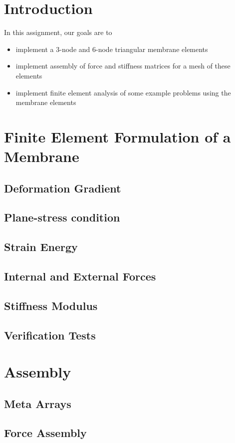 \documentclass[../main.tex]{subfiles}
\begin{document}
\lstset{language=Matlab}
\section*{Introduction}
In this assignment, our goals are to
\begin{itemize}
\item implement a 3-node and 6-node triangular membrane elements
\item implement assembly of force and stiffness matrices for a mesh of
  these elements
\item implement finite element analysis of some example problems using
  the membrane elements
\end{itemize}
\section{Finite Element Formulation of a Membrane}
\subsection{Deformation Gradient}
\subsection{Plane-stress condition}
\subsection{Strain Energy }
\subsection{Internal and External Forces}
\subsection{Stiffness Modulus}
\subsection{Verification Tests}

\section{Assembly}
\subsection{Meta Arrays}
\subsection{Force Assembly}
\end{document}
